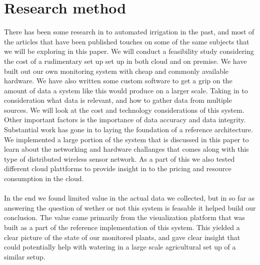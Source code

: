 \documentclass[]{uiophd}
\begin{document}
\section{Research method}
There has been some research in to automated irrigation in the past, and most of the articles that have been published touches on some of the same subjects that we will be exploring in this paper. We will conduct a feasibility study considering the cost of a rudimentary set up set up in both cloud and on premise. We have built out our own monitoring system with cheap and commonly available hardware. We have also written some custom software to get a grip on the amount of data a system like this would produce on a larger scale. Taking in to consideration what data is relevant, and how to gather data from multiple sources. We will look at the cost and technology considerations of this system. Other important factors is the importance of data accuracy and data integrity. Substantial work has gone in to laying the foundation of a reference architecture. We implemented a large portion of the system that is discussed in this paper to learn about the networking and hardware challanges that comes along with this type of distributed wireless sensor network. As a part of this we also tested different cloud plattforms to provide insight in to the pricing and resource consumption in the cloud. 
\\\\
In the end we found limited value in the actual data we collected, but in so far as answering the question of wether or not this system is feasable it helped build our conclusion. The value came primarily from the visualization platform that was built as a part of the reference implementation of this system. This yielded a clear picture of the state of our monitored plants, and gave clear insight that could potentially help with watering in a large scale agricultural set up of a similar setup.
\end{document}
